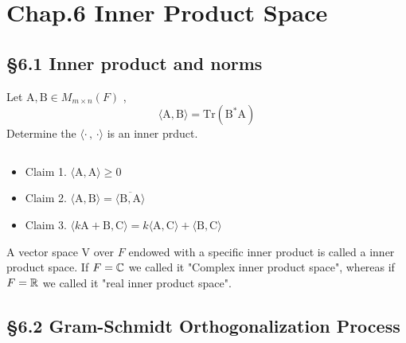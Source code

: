 
\parindent=0pt 
\linespread{1.5}

	\section*{Chap.6 Inner Product Space}		\subsection*{\S 6.1 Inner product and norms}
	
	
	
	
	\begin{example}
		Let $\mathrm{A} , \mathrm{B}\in M_{m\times n}(F)$ ,  $$\langle\mathrm{A}, \mathrm{B}\rangle = \mathrm{Tr}\left(\mathrm{B}^*\mathrm{A}\right)$$ Determine the $\langle\cdot \,,\, \cdot\rangle$ is an inner prduct.
		\begin{sol*}
			$ $
			\begin{itemize}
				\item Claim 1. $\langle\mathrm{A} , \mathrm{A}\rangle \geq 0 $
				\item Claim 2. $\langle\mathrm{A},\mathrm{B}\rangle = \overline{\langle\mathrm{B} , \mathrm{A}\rangle}$
				\item Claim 3. $\langle k\mathrm{A}+\mathrm{B} , \mathrm{C}\rangle = k\langle\mathrm{A} , \mathrm{C}\rangle + \langle\mathrm{B},\mathrm{C}\rangle$
			\end{itemize}
		\end{sol*}
	\end{example}
	\begin{warn}[Notice :]
		A vector space $\mathrm{V}$ over $F$ endowed with a specific inner product is called a inner product space.
		If $F = \mathbb{C}$ we called it "Complex inner product space", whereas if $F = \mathbb{R}$ we called it "real inner product space".  
	\end{warn}
	
	\subsection*{\S 6.2 Gram-Schmidt Orthogonalization Process}
	
